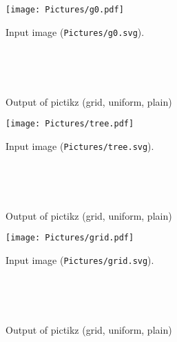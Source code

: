 \documentclass{article}
\begin{document}
\begin{figure}[H]
 \centering
 \texttt{[image: Pictures/g0.pdf]}
 \caption{Input image (\texttt{Pictures/g0.svg}).}
 \end{figure}

 \begin{figure}[H]
 \centering
 \begin{tikzpicture}[scale=1.5]
 
 \end{tikzpicture}~
 \begin{tikzpicture}[scale=1.5]
 
 \end{tikzpicture}~
 \begin{tikzpicture}[scale=1.5]
 
 \end{tikzpicture}
 \caption{Output of pictikz (grid, uniform, plain)}
 \end{figure}\clearpage

\begin{figure}[H]
 \centering
 \texttt{[image: Pictures/tree.pdf]}
 \caption{Input image (\texttt{Pictures/tree.svg}).}
 \end{figure}

 \begin{figure}[H]
 \centering
 \begin{tikzpicture}[scale=1.5]
 
 \end{tikzpicture}~
 \begin{tikzpicture}[scale=1.5]
 
 \end{tikzpicture}~
 \begin{tikzpicture}[scale=1.5]
 
 \end{tikzpicture}
 \caption{Output of pictikz (grid, uniform, plain)}
 \end{figure}\clearpage

\begin{figure}[H]
 \centering
 \texttt{[image: Pictures/grid.pdf]}
 \caption{Input image (\texttt{Pictures/grid.svg}).}
 \end{figure}

 \begin{figure}[H]
 \centering
 \begin{tikzpicture}[scale=1.5]
 
 \end{tikzpicture}~
 \begin{tikzpicture}[scale=1.5]
 
 \end{tikzpicture}~
 \begin{tikzpicture}[scale=1.5]
 
 \end{tikzpicture}
 \caption{Output of pictikz (grid, uniform, plain)}
 \end{figure}\clearpage
\end{document}
